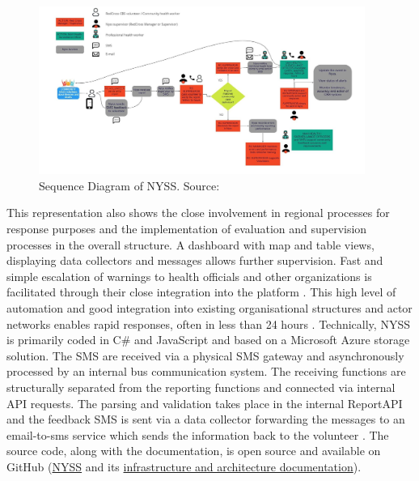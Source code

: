 \begin{figure}[!htp]
    \centering
    \includegraphics[width=0.95\textwidth]{figures/2023_MA_th_nyss_diagram.jpg}
    \decoRule
    \caption[Sequence Diagram of NYSS]{Sequence Diagram of NYSS. Source: \textcite{nrcWhatNyss2023}}
    \label{fig:th_nyss_diagram}
\end{figure}


This representation also shows the close involvement in regional processes for response purposes and the implementation of evaluation and supervision processes in the overall structure. A dashboard with map and table views, displaying data collectors and messages allows further supervision. Fast and simple escalation of warnings to health officials and other organizations is facilitated through their close integration into the platform \autocite{nrcNYSSCommunitybasedSurveillance2021,nrcWhatNyss2023}. This high level of automation and good integration into existing organisational structures and actor networks enables rapid responses, often in less than 24 hours \autocite{jungCommunityBasedSurveillance2022}.\newline
Technically, NYSS is primarily coded in C\# and JavaScript and based on a Microsoft Azure storage solution. The SMS are received via a physical SMS gateway and asynchronously processed by an internal bus communication system. The receiving functions are structurally separated from the reporting functions and connected via internal API requests. The parsing and validation takes place in the internal ReportAPI and the feedback SMS is sent via a data collector forwarding the messages to an email-to-sms service which sends the information back to the volunteer \autocite{nrcNyssToolDeveloped2023,nrcNYSSCommunitybasedSurveillance2021,nrcWhatNyss2023}. The source code, along with the documentation, is open source and available on GitHub (\href{https://github.com/nyss-platform-norcross/nyss}{NYSS} and its \href{https://github.com/nyss-platform-norcross/nyss/tree/master/Infrastructure}{infrastructure and architecture documentation}).

